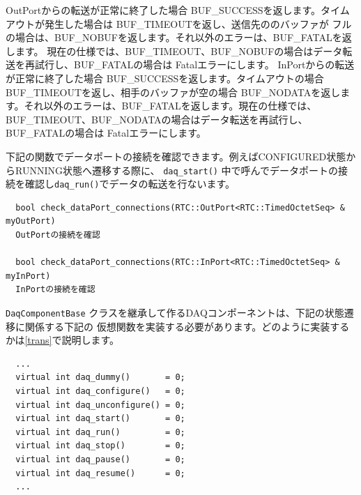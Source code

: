 \documentclass[a4j,10pt,dvips,onecolumn,oneside,final]{jarticle}%
\begin{document}
OutPortからの転送が正常に終了した場合 BUF\_SUCCESSを返します。タイムアウトが発生した場合は BUF\_TIMEOUTを返し、送信先ののバッファが
フルの場合は、BUF\_NOBUFを返します。それ以外のエラーは、BUF\_FATALを返します。
現在の仕様では、BUF\_TIMEOUT、BUF\_NOBUFの場合はデータ転送を再試行し、BUF\_FATALの場合は Fatalエラーにします。
InPortからの転送が正常に終了した場合 BUF\_SUCCESSを返します。タイムアウトの場合 BUF\_TIMEOUTを返し、相手のバッファが空の場合
BUF\_NODATAを返します。それ以外のエラーは、BUF\_FATALを返します。現在の仕様では、BUF\_TIMEOUT、BUF\_NODATAの場合はデータ転送を再試行し、
BUF\_FATALの場合は Fatalエラーにします。

下記の関数でデータポートの接続を確認できます。例えばCONFIGURED状態からRUNNING状態へ遷移する際に、
\verb|daq_start()| 中で呼んでデータポートの接続を確認し\verb|daq_run()|でデータの転送を行ないます。
\begin{Verbatim}  
  bool check_dataPort_connections(RTC::OutPort<RTC::TimedOctetSeq> & myOutPort)
  OutPortの接続を確認

  bool check_dataPort_connections(RTC::InPort<RTC::TimedOctetSeq> & myInPort)
  InPortの接続を確認
\end{Verbatim}

\verb|DaqComponentBase| クラスを継承して作るDAQコンポーネントは、下記の状態遷移に関係する下記の
仮想関数を実装する必要があります。どのように実装するかは\ref{trans}で説明します。

\begin{Verbatim}
  ...
  virtual int daq_dummy()       = 0;
  virtual int daq_configure()   = 0;
  virtual int daq_unconfigure() = 0;
  virtual int daq_start()       = 0;
  virtual int daq_run()         = 0;
  virtual int daq_stop()        = 0;
  virtual int daq_pause()       = 0;
  virtual int daq_resume()      = 0;
  ...
\end{Verbatim}


\end{document}
